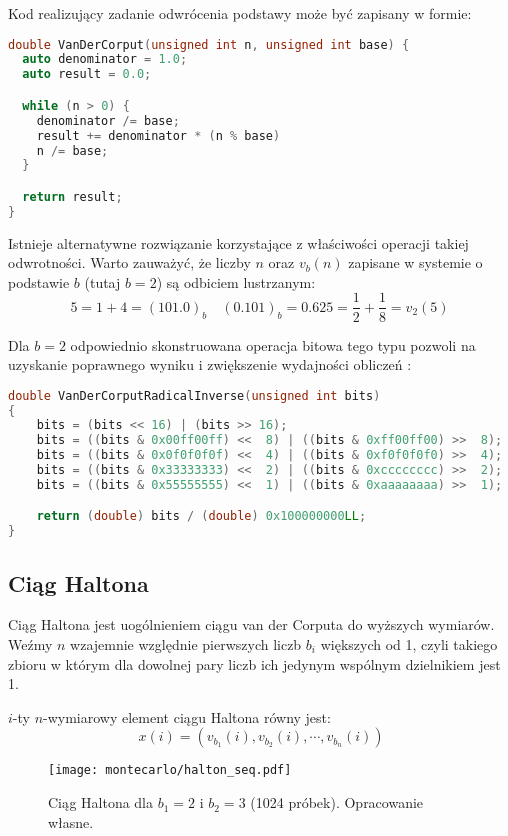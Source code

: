 \documentclass[../main.tex]{subfiles}
\begin{document}
Kod realizujący zadanie odwrócenia podstawy może być zapisany w formie:

\begin{lstlisting}[language=c++]
double VanDerCorput(unsigned int n, unsigned int base) {
  auto denominator = 1.0;
  auto result = 0.0;

  while (n > 0) {
    denominator /= base;
    result += denominator * (n % base)
    n /= base;
  }

  return result;
}
\end{lstlisting}

Istnieje alternatywne rozwiązanie korzystające z właściwości operacji takiej odwrotności. Warto zauważyć, że liczby $n$ oraz $v_b(n)$ zapisane w systemie o podstawie $b$ (tutaj $b=2$) są odbiciem lustrzanym:
\[
  5 = 1 + 4 = (101.0)_{b} \quad
  (0.101)_{b} = 0.625 = \frac{1}{2} + \frac{1}{8} = v_2(5)
\]

Dla $b=2$ odpowiednio skonstruowana operacja bitowa tego typu pozwoli na uzyskanie poprawnego wyniku i zwiększenie wydajności obliczeń \cite{dammertz_2012,MultidimensionalSampling}:

\begin{lstlisting}[language=c++]
double VanDerCorputRadicalInverse(unsigned int bits)
{
	bits = (bits << 16) | (bits >> 16);
	bits = ((bits & 0x00ff00ff) <<  8) | ((bits & 0xff00ff00) >>  8);
	bits = ((bits & 0x0f0f0f0f) <<  4) | ((bits & 0xf0f0f0f0) >>  4);
	bits = ((bits & 0x33333333) <<  2) | ((bits & 0xcccccccc) >>  2);
	bits = ((bits & 0x55555555) <<  1) | ((bits & 0xaaaaaaaa) >>  1);

	return (double) bits / (double) 0x100000000LL;
}
\end{lstlisting}

\subsection{Ciąg Haltona}

Ciąg Haltona jest uogólnieniem ciągu van der Corputa do wyższych wymiarów. Weźmy $n$ wzajemnie względnie pierwszych liczb $b_i$ większych od 1, czyli takiego zbioru w którym dla dowolnej pary liczb ich jedynym wspólnym dzielnikiem jest 1.

$i$-ty $n$-wymiarowy element ciągu Haltona równy jest:
\begin{equation}\
x(i) = \left( v_{b_1}(i), v_{b_2}(i), \cdots, v_{b_n}(i) \right) 
\end{equation}

\begin{figure}[h]
  \centering
  \texttt{[image: montecarlo/halton\_seq.pdf]}
  \caption{Ciąg Haltona dla $b_1=2$ i $b_2=3$ (1024 próbek). Opracowanie własne.}
  \label{fig:HaltonSamples}
\end{figure}
\end{document}
